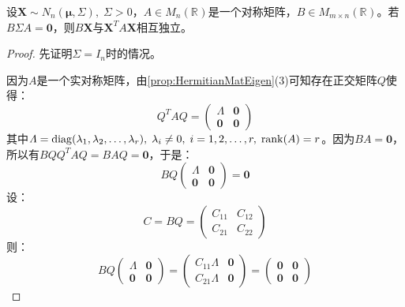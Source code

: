 \begin{corollary}\label{cor:XAXChi2}
\end{corollary}
\begin{theorem}\label{theo:BXXAXIndependent}
	设$\mathbf{X}\sim N_n(\boldsymbol{\mu},\Sigma),\;\Sigma>0$，$A\in M_{n}(\mathbb{R}^{})$是一个对称矩阵，$B\in M_{m\times n}(\mathbb{R}^{})$。若$B\Sigma A=\mathbf{0}$，则$B\mathbf{X}$与$\mathbf{X}^TA\mathbf{X}$相互独立。
\end{theorem}
\begin{proof}
	先证明$\Sigma=I_n$时的情况。\par
	因为$A$是一个实对称矩阵，由\cref{prop:HermitianMatEigen}(3)可知存在正交矩阵$Q$使得：
	\begin{equation*}
		Q^TAQ=
		\begin{pmatrix}
			\varLambda & \mathbf{0} \\
			\mathbf{0} & \mathbf{0}
		\end{pmatrix}
	\end{equation*}
	其中$\varLambda=\operatorname{diag}(\lambda_1, \lambda_2, \dots, \lambda_{r}),\;\lambda_i\ne0,\;i=1,2,\dots,r,\;\operatorname{rank}(A)=r$。因为$BA=\mathbf{0}$，所以有$BQQ^TAQ=BAQ=\mathbf{0}$，于是：
	\begin{equation*}
		BQ
		\begin{pmatrix}
			\varLambda & \mathbf{0} \\
			\mathbf{0} & \mathbf{0}
		\end{pmatrix}
		=\mathbf{0}
	\end{equation*}
	设：
	\begin{equation*}
		C=BQ=
		\begin{pmatrix}
			C_{11} & C_{12} \\
			C_{21} & C_{22}
		\end{pmatrix}
	\end{equation*}
	则：
	\begin{equation*}
		BQ
		\begin{pmatrix}
			\varLambda & \mathbf{0} \\
			\mathbf{0} & \mathbf{0}
		\end{pmatrix}
		=
		\begin{pmatrix}
			C_{11}\varLambda & \mathbf{0} \\
			C_{21}\varLambda & \mathbf{0}
		\end{pmatrix}
		=\begin{pmatrix}
			\mathbf{0} & \mathbf{0} \\
			\mathbf{0} & \mathbf{0}
		\end{pmatrix}

\end{equation*}
\end{proof}
